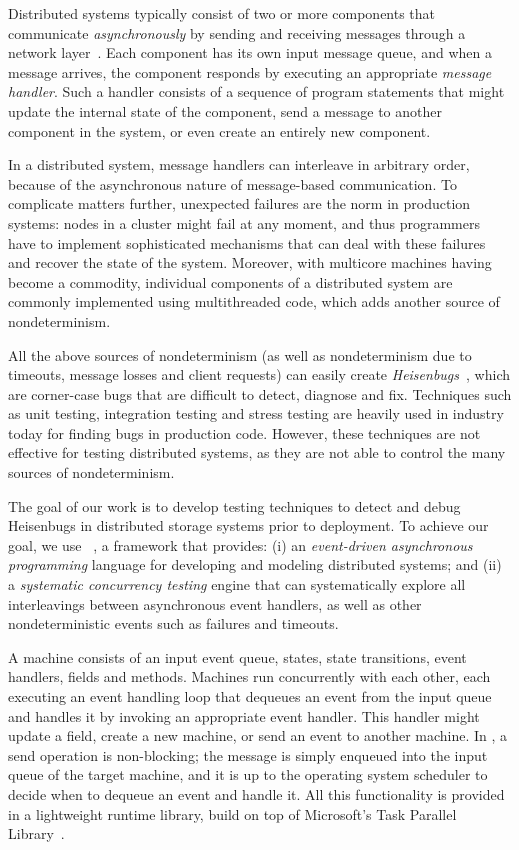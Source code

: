 Distributed systems typically consist of two or more components that communicate \emph{asynchronously} by sending and receiving messages through a network layer~\cite{lamport1978time}. Each component has its own input message queue, and when a message arrives, the component responds by executing an appropriate \emph{message handler}. Such a handler consists of a sequence of program statements that might update the internal state of the component, send a message to another component in the system, or even create an entirely new component.

In a distributed system, message handlers can interleave in arbitrary order, because of the asynchronous nature of message-based communication. To complicate matters further, unexpected failures are the norm in production systems: nodes in a cluster might fail at any moment, and thus programmers have to implement sophisticated mechanisms that can deal with these failures and recover the state of the system. Moreover, with multicore machines having become a commodity, individual components of a distributed system are commonly implemented using multithreaded code, which adds another source of nondeterminism.

All the above sources of nondeterminism (as well as nondeterminism due to timeouts, message losses and client requests) can easily create \emph{Heisenbugs}~\cite{gray1986computers, musuvathi2008finding}, which are corner-case bugs that are difficult to detect, diagnose and fix. Techniques such as unit testing, integration testing and stress testing are heavily used in industry today for finding bugs in production code. However, these techniques are not effective for testing distributed systems, as they are not able to control the many sources of nondeterminism.

The goal of our work is to develop testing techniques to detect and debug Heisenbugs in distributed storage systems prior to deployment.
To achieve our goal, we use \psharp~\cite{deligiannis2015psharp}, a framework that provides: (i) an \emph{event-driven asynchronous programming} language for developing and modeling distributed systems; and (ii) a \emph{systematic concurrency testing} engine that can systematically explore all interleavings between asynchronous event handlers, as well as other nondeterministic events such as failures and timeouts.

A \psharp machine consists of an input event queue, states, state transitions, event handlers, fields and methods. Machines run concurrently with each other, each executing an event handling loop that dequeues an event from the input queue and handles it by invoking an appropriate event handler. This handler might update a field, create a new machine, or send an event to another machine. In \psharp, a send operation is non-blocking; the message is simply enqueued into the input queue of the target machine, and it is up to the operating system scheduler to decide when to dequeue an event and handle it. All this functionality is provided in a lightweight runtime library, build on top of Microsoft's Task Parallel Library~\cite{leijen2009tpl}.

